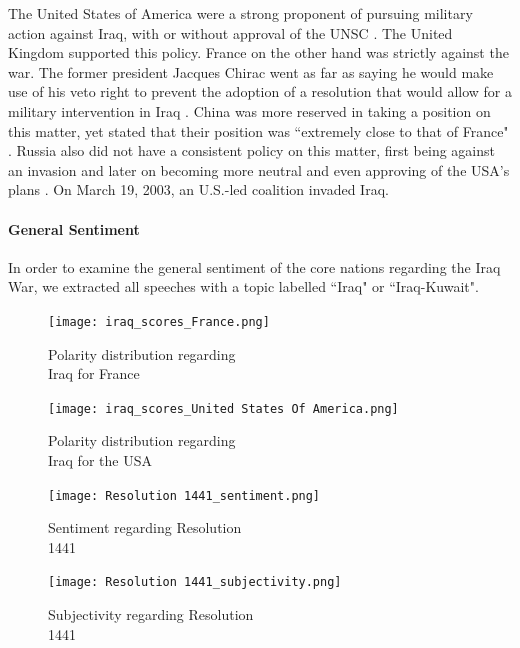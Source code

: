 The United States of America were a strong proponent of pursuing military action against Iraq, with or without approval of the UNSC \citep{usairaq}. The United Kingdom supported this policy.
France on the other hand was strictly against the war. The former president Jacques Chirac went as far as saying he would make use of his veto right to prevent the adoption of a resolution that would allow for a military intervention in Iraq \citep{nyt}.
China was more reserved in taking a position on this matter, yet stated that their position was ``extremely close to that of France" \citep{cnn}. Russia also did not have a consistent policy on this matter, first being against an invasion and later on becoming more neutral and even approving of the USA's plans \citep{russiairaq}.
On March 19, 2003, an U.S.-led coalition invaded Iraq.

\vspace{-5pt}
\paragraph{General Sentiment}
In order to examine the general sentiment of the core nations regarding the Iraq War, we extracted all speeches with a topic labelled ``Iraq" or ``Iraq-Kuwait". 

\begin{figure}[H]
    \centering
    \begin{minipage}{0.47\textwidth}
        \centering
        \texttt{[image: iraq\_scores\_France.png]} %
        \caption{Polarity distribution regarding \\ Iraq for France}
        \label{iraqfr}
    \end{minipage}\hfill
    \begin{minipage}{0.47\textwidth}
        \centering
        \texttt{[image: iraq\_scores\_United States Of America.png]} %
        \caption{Polarity distribution regarding \\ Iraq for the USA}
        \label{iraqusa}
    \end{minipage}
\end{figure}

\begin{figure}[H]
    \centering
    \begin{minipage}{0.47\textwidth}
        \centering
        \texttt{[image: Resolution 1441\_sentiment.png]} %
        \caption{Sentiment regarding Resolution \\ 1441}
        \label{1441sent}
    \end{minipage}\hfill
    \begin{minipage}{0.47\textwidth}
        \centering
        \texttt{[image: Resolution 1441\_subjectivity.png]} %
        \caption{Subjectivity regarding Resolution \\ 1441}
        \label{1441subj}
    \end{minipage}
\end{figure}

